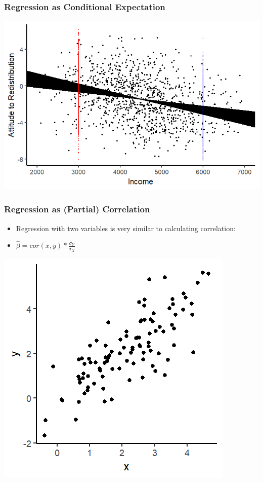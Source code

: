 \documentclass[xcolor=x11names,compress]{beamer}\usepackage[]{graphicx}\usepackage[]{color}
\makeatletter
\def\maxwidth{ %
  \ifdim\Gin@nat@width>\linewidth
    \linewidth
  \else
    \Gin@nat@width
  \fi
}
\newenvironment{knitrout}{}{} %
\renewcommand{\(}{\begin{columns}}
\renewcommand{\)}{\end{columns}}
\newcommand{\<}[1]{\begin{column}{#1}}
\renewcommand{\>}{\end{column}}
\makeatother
\begin{document}
\begin{frame}
\frametitle{Regression as Conditional Expectation}
\begin{knitrout}
\color{fgcolor}
\includegraphics[width=\maxwidth]{figure/cond_exp1i-1} 

\end{knitrout}
\end{frame}




\begin{frame}
\frametitle{Regression as (Partial) Correlation}
\begin{itemize}
\item Regression with two variables is very similar to calculating correlation:
\pause
\item $\hat{\beta}=cor(x,y) * \frac{\sigma_Y}{\sigma_X}$
\pause
\end{itemize}
\begin{multicols}{2}
\begin{knitrout}
\color{fgcolor}
\includegraphics[width=\maxwidth]{figure/corr_regn_fig1-1} 

\end{knitrout}
\columnbreak
\end{multicols}
\end{frame}
\end{document}
